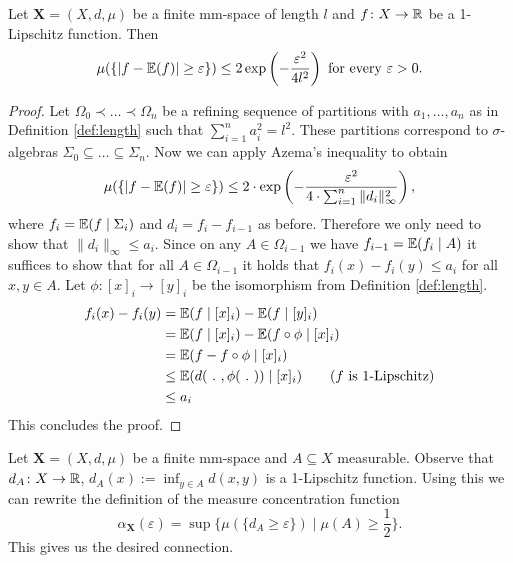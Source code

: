 \begin{lemma}\label{lem:lipschitz}
Let $\boldsymbol{X}=(X,d,\mu)$ be a finite mm-space of length $l$ and $f\colon X\to\mathbb{R}$ be a 1-Lipschitz function. Then
\[\mu(\{|f-\mathbb{E}(f)|\geq\varepsilon\})\leq 2\exp\left(-\frac{\varepsilon^2}{4l^2}\right)\text{ for every $\varepsilon>0$.}\] 
\end{lemma}
\begin{proof}
Let 
$\Omega_0\prec\dots\prec\Omega_n$
be a refining sequence of partitions with $a_1,\dots,a_n$ as in Definition \ref{def:length} such that $\sum_{i=1}^{n}a_i^2=l^2$. These partitions correspond to $\sigma$-algebras $\Sigma_0\subseteq\dots\subseteq\Sigma_n$. Now we can apply Azema's inequality to obtain
\[\mu(\{|f-\mathbb{E}(f)|\geq \varepsilon\})\leq 2\cdot\exp\left(-\frac{\varepsilon^2}{4\cdot\sum_{i=1}^{n}\|d_i\|^2_\infty}\right),\]
where $f_i=\mathbb{E}(f\mid \Sigma_i)$ and $d_i=f_i-f_{i-1}$ as before. Therefore we only need to show that $\|d_i\|_\infty\leq a_i$. Since on any $A\in\Omega_{i-1}$ we have $f_{i-1}=\mathbb{E}(f_i\mid A)$ it suffices to show that for all $A\in\Omega_{i-1}$ it holds that $f_i(x)-f_i(y)\leq a_i$ for all $x,y\in A$.
Let $\phi\colon [x]_i\to [y]_i$ be the isomorphism from Definition \ref{def:length}.
\begin{align*}
f_i(x)-f_i(y)&=\mathbb{E}(f\mid [x]_i)-\mathbb{E}(f\mid [y]_i)\\
&=\mathbb{E}(f\mid [x]_i)-\mathbb{E}(f\circ\phi\mid [x]_i)\\
&=\mathbb{E}(f-f\circ\phi\mid [x]_i)\\
&\leq \mathbb{E}(d(\ .\ ,\phi(\ .\ ))\mid [x]_i)\tag{$f$ is 1-Lipschitz}\\
&\leq a_i
\end{align*}
This concludes the proof.
\end{proof}

Let $\boldsymbol{X}=(X,d,\mu)$ be a finite mm-space and $A\subseteq X$ measurable. Observe that $d_A\colon X\to\mathbb{R}$, $d_A(x):=\inf_{y\in A}d(x,y)$ is a 1-Lipschitz function. Using this we can rewrite the definition of the measure concentration function 
\[\alpha_{\boldsymbol{X}}(\varepsilon)=\sup\{\mu(\{d_A\geq\varepsilon\})\mid \mu(A)\geq\frac{1}{2}\}.\]
This gives us the desired connection.


